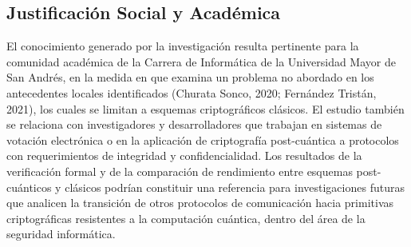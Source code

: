 \subsection{Justificación Social y Académica}

El conocimiento generado por la investigación resulta pertinente para la comunidad académica de la Carrera de Informática de la Universidad Mayor de San Andrés, en la medida en que examina un problema no abordado en los antecedentes locales identificados (Churata Sonco, 2020; Fernández Tristán, 2021), los cuales se limitan a esquemas criptográficos clásicos. El estudio también se relaciona con investigadores y desarrolladores que trabajan en sistemas de votación electrónica o en la aplicación de criptografía post-cuántica a protocolos con requerimientos de integridad y confidencialidad. Los resultados de la verificación formal y de la comparación de rendimiento entre esquemas post-cuánticos y clásicos podrían constituir una referencia para investigaciones futuras que analicen la transición de otros protocolos de comunicación hacia primitivas criptográficas resistentes a la computación cuántica, dentro del área de la seguridad informática.
